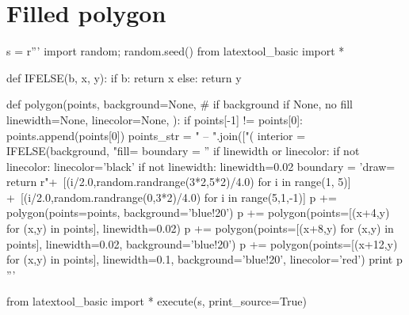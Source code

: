 \section{Filled polygon}

\begin{python}
s = r'''
import random; random.seed()
from latextool_basic import *

def IFELSE(b, x, y):
    if b: return x
    else: return y
    
def polygon(points,
            background=None, # if background if None, no fill
            linewidth=None,
            linecolor=None,
            ):
    if points[-1] != points[0]: points.append(points[0])
    points_str = " -- ".join(["(%
    interior = IFELSE(background, "fill=%
    boundary = ''
    if linewidth or linecolor:
        if not linecolor: linecolor='black'
        if not linewidth: linewidth=0.02
        boundary = 'draw=%
    return r" +\
         [(i/2.0,random.randrange(3*2,5*2)/4.0) for i in range(1, 5)] +\
         [(i/2.0,random.randrange(0,3*2)/4.0) for i in range(5,1,-1)]      
p += polygon(points=points, background='blue!20')
p += polygon(points=[(x+4,y) for (x,y) in points], linewidth=0.02)
p += polygon(points=[(x+8,y) for (x,y) in points], linewidth=0.02,
             background='blue!20')
p += polygon(points=[(x+12,y) for (x,y) in points], linewidth=0.1,
             background='blue!20', linecolor='red')
print p
'''

from latextool_basic import *
execute(s, print_source=True)
\end{python}

